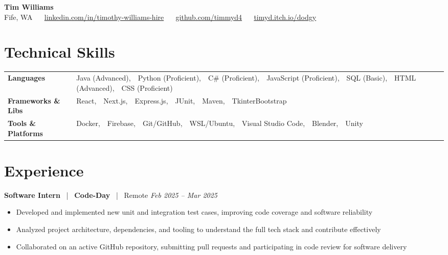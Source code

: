 \documentclass[10pt, letterpaper]{article}
\newcommand{\jobhead}[4]{%
  \vspace{5pt}%
  {\bfseries\color{dark}#1}%
  ~{\color{light}|}~%
  {\bfseries\color{navy}#2}%
  ~{\color{light}|}~%
  {\color{light}#3}%
  \hfill{\color{light}\small\textit{#4}}\\[-2pt]%
}
\newcommand{\skillrow}[2]{%
  {\bfseries #1} & #2 \\[2pt]%
}
\begin{document}

\begin{center}
  {\huge\bfseries\color{navy} Tim Williams}\\[4pt]
  {\small\color{light}
    Fife, WA
    ~\textbullet~
    \href{https://linkedin.com/in/timothy-williams-hire}{linkedin.com/in/timothy-williams-hire}
    ~\textbullet~
    \href{https://github.com/timmyd4}{github.com/timmyd4}
    ~\textbullet~
    \href{https://timyd.itch.io/dodgy}{timyd.itch.io/dodgy}
  }
\end{center}

\vspace{2pt}

\section{Technical Skills}

\begin{tabular}{@{}p{1.6in} p{5.2in}@{}}
  \skillrow{Languages}{Java (Advanced),\ \ Python (Proficient),\ \ C\# (Proficient),\ \ JavaScript (Proficient),\ \ SQL (Basic),\ \ HTML (Advanced),\ \ CSS (Proficient)}
  \skillrow{Frameworks \& Libs}{React,\ \ Next.js,\ \ Express.js,\ \ JUnit,\ \ Maven,\ \ TkinterBootstrap}
  \skillrow{Tools \& Platforms}{Docker,\ \ Firebase,\ \ Git/GitHub,\ \ WSL/Ubuntu,\ \ Visual Studio Code,\ \ Blender,\ \ Unity}
\end{tabular}

\section{Experience}

\jobhead{Software Intern}{Code-Day}{Remote}{Feb 2025 – Mar 2025}
\begin{itemize}
  \item Developed and implemented new unit and integration test cases, improving code coverage and software reliability
  \item Analyzed project architecture, dependencies, and tooling to understand the full tech stack and contribute effectively
  \item Collaborated on an active GitHub repository, submitting pull requests and participating in code review for software delivery
\end{itemize}
\end{document}
